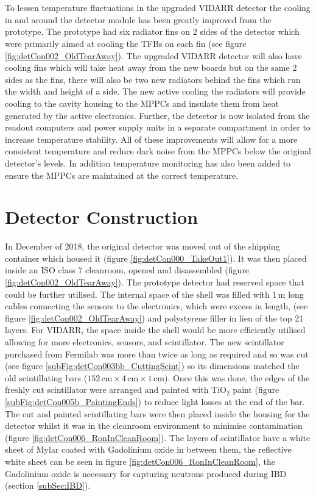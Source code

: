 \\\\To lessen temperature fluctuations in the upgraded VIDARR detector the cooling in and around the detector module has been greatly improved from the prototype. The prototype had six radiator fins on 2 sides of the detector which were primarily aimed at cooling the TFBs on each fin (see figure \ref{fig:detCon002_OldTearAway}). The upgraded VIDARR detector will also have cooling fins which will take heat away from the new boards but on the same 2 sides as the fins, there will also be two new radiators behind the fins which run the width and height of a side. The new active cooling the radiators will provide cooling to the cavity housing to the MPPCs and insulate them from heat generated by the active electronics. Further, the detector is now isolated from the readout computers and power supply units in a separate compartment in order to increase temperature stability. All of these improvements will allow for a more consistent temperature and reduce dark noise from the MPPCs below the original detector's levels. In addition temperature monitoring has also been added to ensure the MPPCs are maintained at the correct temperature.

\section{Detector Construction}\label{sec:DetectorConstruction}
In December of 2018, the original detector was moved out of the shipping container which housed it (figure \ref{fig:detCon000_TakeOut1}). It was then placed inside an ISO class 7 cleanroom, opened and disassembled (figure \ref{fig:detCon002_OldTearAway}). The prototype detector had reserved space that could be further utilised. The internal space of the shell was filled with 1\,m long cables connecting the sensors to the electronics, which were excess in length, (see figure \ref{fig:detCon002_OldTearAway}) and polystyrene filler in lieu of the top 21 layers. For VIDARR, the space inside the shell would be more efficiently utilised allowing for more electronics, sensors, and scintillator. The new scintillator purchased from Fermilab was more than twice as long as required and so was cut (see figure \ref{subFig:detCon003bb_CuttingScint}) so its dimensions matched the old scintillating bars ($152\,\textrm{cm} \times 4\,\textrm{cm} \times 1\,\textrm{cm}$). Once this was done, the edges of the freshly cut scintillator were arranged and painted with TiO$_2$ paint (figure \ref{subFig:detCon005b_PaintingEnds}) to reduce light losses at the end of the bar. The cut and painted scintillating bars were then placed inside the housing for the detector whilst it was in the cleanroom environment to minimise contamination (figure \ref{fig:detCon006_RonInCleanRoom}). The layers of scintillator have a white sheet of Mylar coated with Gadolinium oxide in between them, the reflective white sheet can be seen in figure \ref{fig:detCon006_RonInCleanRoom}, the Gadolinium oxide is necessary for capturing neutrons produced during IBD (section \ref{subSec:IBD}). 

